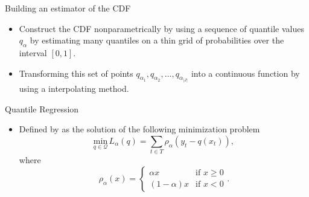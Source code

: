 \begin{frame}{Building an estimator of the CDF}
	\begin{itemize}
		\item Construct the CDF nonparametrically by using a sequence of quantile values $q_\alpha$ by estimating many quantiles on a thin grid of probabilities over the interval $[0,1]$. 
		
		\item Transforming this set of points $q_{\alpha_1}, q_{\alpha_2}, \dots, q_{\alpha_{|J|}}$ into a continuous function by using a interpolating method. 

	\end{itemize}
\end{frame}


\begin{frame}{Quantile Regression}
	\begin{itemize}
		\item Defined by \cite{koenker1978regression} as the solution of the following minimization problem 
			\begin{equation}
				\underset{q\in\mathcal{Q}}{\text{min}}\, L_\alpha(q) = \sum_{t\in T}\rho_{\alpha}(y_{t}-q(x_t)),\label{eq:optim-lqr1} 
			\end{equation}
			where
			\begin{equation}\label{eq:check-function}
				\rho_{\alpha}(x)=\begin{cases}
				\alpha x & \text{if }x\geq0\\
				(1-\alpha)x & \text{if }x<0
				\end{cases}.
			\end{equation}
	\end{itemize}
\end{frame}


